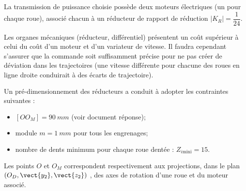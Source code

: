 La transmission de puissance choisie possède deux moteurs électriques (un pour chaque roue), associé chacun à un réducteur de rapport de réduction  $|K_R| =\dfrac{1}{24}$.
\fi

\ifprof
\begin{corrige}
Les organes mécaniques (réducteur, différentiel) présentent un coût supérieur à celui du coût d'un moteur et d'un variateur de vitesse. Il faudra cependant s'assurer que la commande soit suffisamment précise pour ne pas créer de déviation dans les trajectoires (une vitesse différente pour chacune des roues en ligne droite conduirait à des écarts de trajectoire).
\end{corrige}
\else
\fi

\ifprof
\else

Un pré-dimensionnement des réducteurs a conduit à adopter les contraintes suivantes :
\begin{itemize}
\item $[OO_M]=\SI{90}{mm}$ (voir document réponse);
\item module $m=\SI{1}{mm}$  pour tous les engrenages;
\item nombre de dents minimum pour chaque roue dentée : $Z_{i \text{mini}}=15$. 
\end{itemize}

Les points $O$ et $O_M$ correspondent respectivement aux projections, dans le plan $\left( O_D,\vect{y_2},\vect{z_2}\right)$ , des axes de rotation d’une roue et du moteur associé.
\fi


